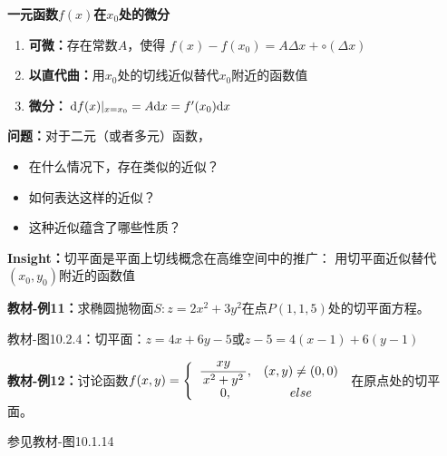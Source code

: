 \begin{shaded}
	{\bf 一元函数$f(x)$在$x_0$处的微分}
	
	\begin{enumerate}[(1)]
  	  \setlength{\itemindent}{1cm}
	  \item {\bf 可微：}存在常数$A$，使得
	  $f(x)-f(x_0)=A\Delta x+\circ(\Delta x)$
	  \item {\bf 以直代曲：}用$x_0$处的切线近似替代$x_0$附近的函数值 
	  \item {\bf 微分：}$\mathrm{d} f(x)|_{x=x_0}=A\mathrm{d} x=f'(x_0)\mathrm{d} x$
	\end{enumerate}
\end{shaded}

{\bf 问题：}对于二元（或者多元）函数， 
\begin{itemize}
  \item 在什么情况下，存在类似的近似？
  \item 如何表达这样的近似？ 
  \item 这种近似蕴含了哪些性质？
\end{itemize}

{\bf Insight：}切平面是平面上切线概念在高维空间中的推广：
用切平面近似替代$(x_0,y_0)$附近的函数值

{\bf 教材-例11：}求椭圆抛物面$S:z=2x^2+3y^2$在点$P(1,1,5)$处的切平面方程。

\begin{center}
	
	教材-图10.2.4：切平面：$z=4x+6y-5$或$z-5=4(x-1)+6(y-1)$
\end{center}

{\bf 教材-例12：}讨论函数$f(x,y)=\left\{\begin{array}{cc}
	\displaystyle\frac{\,{xy}\,}{\,{x^2+y^2}\,},& (x,y)\ne (0,0)\\
	0, & else
\end{array}\right.$
在原点处的切平面。

\begin{center}
	
	参见教材-图10.1.14
\end{center}

